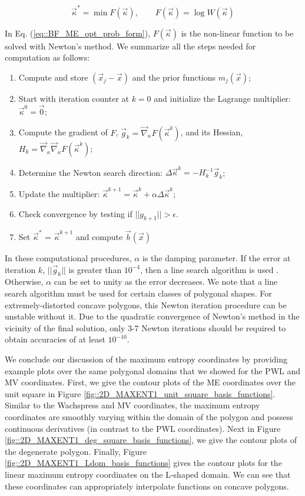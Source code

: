 \begin{equation}
\label{eq::BF_ME_opt_prob_form}
\vec{\kappa}^* = \min F(\vec{\kappa}) , \qquad F(\vec{\kappa}) = \log W (\vec{\kappa})
\end{equation}

\noindent In Eq. (\ref{eq::BF_ME_opt_prob_form}),  $F(\vec{\kappa})$ is the non-linear function to be solved with Newton's method. We summarize all the steps needed for computation as follows:

\begin{enumerate}
\item Compute and store $(\vec{x}_j - \vec{x})$ and the prior functions $m_j (\vec{x})$;
\item Start with iteration counter at $k=0$ and initialize the Lagrange multiplier: $\vec{\kappa}^0 = \vec{0}$;
\item Compute the gradient of $F$, $\vec{g}_k = \vec{\nabla}_{\kappa} F (\vec{\kappa}^k)$, and its Hessian, $H_k = \vec{\nabla}_{\kappa} \vec{\nabla}_{\kappa}  F (\vec{\kappa}^k)$;
\item Determine the Newton search direction: $\Delta \vec{\kappa}^k = - H_k^{-1} \vec{g}_k$;
\item Update the multiplier: $\vec{\kappa}^{k+1} =\vec{\kappa}^k + \alpha \Delta \vec{\kappa}^k$;
\item Check convergence by testing if $|| g_{k+1} || > \epsilon$.
\item Set $\vec{\kappa}^*$ = $\vec{\kappa}^{k+1}$ and compute $\vec{b} (\vec{x})$
\end{enumerate}

In these computational procedures, $\alpha$ is the damping parameter. If the error at iteration $k$, $|| \vec{g}_{k} || $ is greater than $10^{-4}$, then a line search algorithm is used \cite{burden2001numerical}. Otherwise, $\alpha$ can be set to unity as the error decreases. We note that a line search algorithm must be used for certain classes of polygonal shapes. For extremely-distorted concave polygons, this Newton iteration procedure can be unstable without it. Due to the quadratic convergence of Newton's method in the vicinity of the final solution, only 3-7 Newton iterations should be required to obtain accuracies of at least $10^{-10}$. 

We conclude our discussion of the maximum entropy coordinates by providing example plots over the same polygonal domains that we showed for the PWL and MV coordinates. First, we give the contour plots of the ME coordinates over the unit square in Figure \ref{fig::2D_MAXENT1_unit_square_basis_functions}. Similar to the Wachspress and MV coordinates, the maximum entropy coordinates are smoothly varying within the domain of the polygon and possess continuous derivatives (in contrast to the PWL coordinates). Next in Figure \ref{fig::2D_MAXENT1_deg_square_basis_functions}, we give the contour plots of the degenerate polygon. Finally, Figure \ref{fig::2D_MAXENT1_Ldom_basis_functions} gives the contour plots for the linear maximum entropy coordinates on the L-shaped domain. We can see that these coordinates can appropriately interpolate functions on concave polygons.

